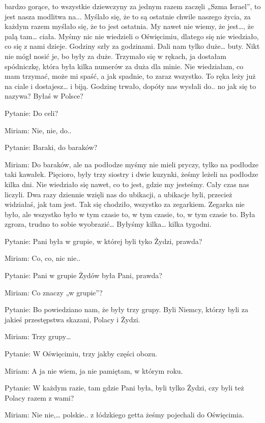 bardzo gorące, to wszystkie dziewczyny za jednym razem zaczęli „Szma Israel”, to jest nasza modlitwa na... Myślało się, że to są ostatnie chwile naszego życia, za każdym razem myślało się, że to jest ostatnia. My nawet nie wiemy, że jest…, że palą tam… ciała. Myśmy nic nie wiedzieli o Oświęcimiu, dlatego się nie wiedziało, co się z nami dzieje. Godziny szły za godzinami. Dali nam tylko duże… buty. Nikt nie mógł nosić je, bo były za duże. Trzymało się w rękach, ja dostałam spódniczkę, która była kilka numerów za duża dla minie. Nie wiedziałam, co mam trzymać, może mi spaść, a jak spadnie, to zaraz wszystko. To ręka leży już na ciale i dostajesz… i biją. Godzinę trwało, dopóty nas wysłali do.. no jak się to nazywa? Byłaś w Polsce? 

Pytanie: Do celi? 

Miriam: Nie, nie, do.. 

Pytanie: Baraki, do baraków? 

Miriam: Do baraków, ale na podłodze myśmy nie mieli pryczy, tylko na podłodze taki kawałek. Pięcioro, były trzy siostry i dwie kuzynki, żeśmy leżeli na podłodze kilka dni. Nie wiedziało się nawet, co to jest, gdzie my jesteśmy. Cały czas nas liczyli. Dwa razy dziennie wzięli nas do ubikacji, a ubikacje byli, przecież widziałaś, jak tam jest. Tak się chodziło, wszystko za zegarkiem. Zegarka nie było, ale wszystko było w tym czasie to, w tym czasie, to, w tym czasie to. Była zgroza, trudno to sobie wyobrazić… Byłyśmy kilka… kilka tygodni. 

 

Pytanie: Pani była w grupie, w której byli tyko Żydzi, prawda? 

Miriam: Co, co, nic nie.. 

Pytanie: Pani w grupie Żydów była Pani, prawda? 

Miriam: Co znaczy „w grupie”? 

Pytanie: Bo powiedziano nam, że były trzy grupy. Byli Niemcy, którzy byli za jakieś przestępstwa skazani, Polacy i Żydzi. 

Miriam: Trzy grupy… 

Pytanie: W Oświęcimiu, trzy jakby części obozu. 

Miriam: A ja nie wiem, ja nie pamiętam, w którym roku. 

Pytanie: W każdym razie, tam gdzie Pani była, byli tylko Żydzi, czy byli też Polacy razem z wami? 

Miriam: Nie nie,… polskie.. z łódzkiego getta żeśmy pojechali do Oświęcimia. 

